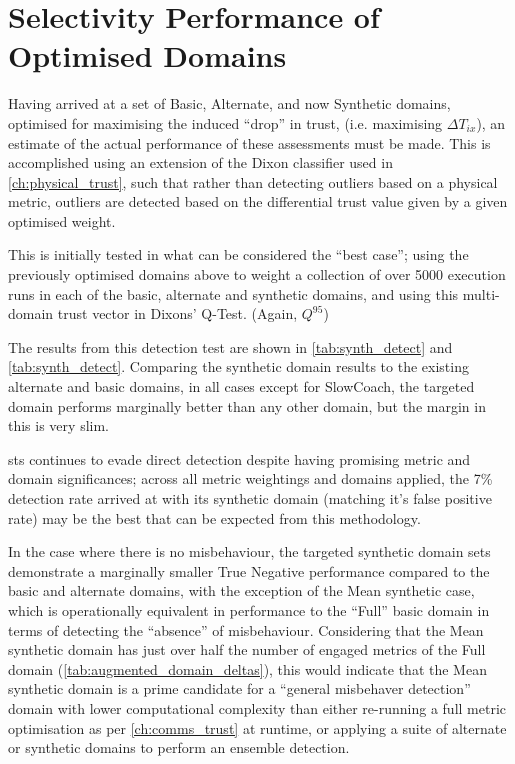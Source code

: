 \section{Selectivity Performance of Optimised Domains}

Having arrived at a set of Basic, Alternate, and now Synthetic domains, optimised for maximising the induced ``drop'' in trust, (i.e. maximising $\Delta T_{ix}$), an estimate of the actual performance of these assessments must be made.
This is accomplished using an extension of the Dixon classifier used in \autoref{ch:physical_trust}, such that rather than detecting outliers based on a physical metric, outliers are detected based on the differential trust value given by a given optimised weight.

This is initially tested in what can be considered the ``best case''; using the previously optimised domains above to weight a collection of over 5000 execution runs in each of the basic, alternate and synthetic domains, and using this multi-domain trust vector in Dixons' Q-Test. (Again, $Q^{95}$)

The results from this detection test are shown in \autoref{tab:synth_detect} and \autoref{tab:synth_detect}.
Comparing the synthetic domain results to the existing alternate and basic domains, in all cases except for SlowCoach, the targeted domain performs marginally better than any other domain, but the margin in this is very slim.

\gls{sts} continues to evade direct detection despite having promising metric and domain significances; across all metric weightings and domains applied, the 7\% detection rate arrived at with its synthetic domain (matching it's false positive rate) may be the best that can be expected from this methodology.

In the case where there is no misbehaviour, the targeted synthetic domain sets demonstrate a marginally smaller True Negative performance compared to the basic and alternate domains, with the exception of the Mean synthetic case, which is operationally equivalent in performance to the ``Full'' basic domain in terms of detecting the ``absence'' of misbehaviour. 
Considering that the Mean synthetic domain has just over half the number of engaged metrics of the Full domain (\autoref{tab:augmented_domain_deltas}), this would indicate that the Mean synthetic domain is a prime candidate for a ``general misbehaver detection'' domain with lower computational complexity than either re-running a full metric optimisation as per \autoref{ch:comms_trust} at runtime, or applying a suite of alternate or synthetic domains to perform an ensemble detection.

